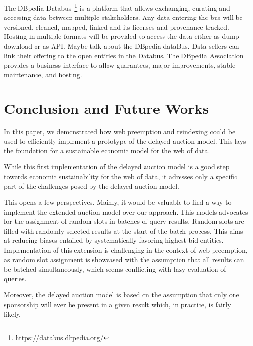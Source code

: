 \documentclass[runningheads]{llncs}
\begin{document}
The DBpedia Databus~\footnote{\url{https://databus.dbpedia.org/}} is a
platform that allows exchanging, curating and accessing data between
multiple stakeholders. Any data entering the bus will be versioned,
cleaned, mapped, linked and its licenses and provenance
tracked. Hosting in multiple formats will be provided to access the
data either as dump download or as API.  Maybe talk about the DBpedia
dataBus.  Data sellers can link their offering to the open entities in
the Databus. The DBpedia Association provides a business interface to
allow guarantees, major improvements, stable maintenance, and hosting.

\section{Conclusion and Future Works}
\label{sec:concl-future-works}

In this paper, we demonstrated how web preemption and reindexing could be
used to efficiently implement a prototype of the delayed auction
model.  This lays the foundation for a sustainable economic model for
the web of data.


While this first implementation of the delayed auction model is a good
step towards economic sustainability for the web of data, it adresses
only a specific part of the challenges posed by the delayed auction
model.

This opens a few perspectives. Mainly, it would be valuable to find a
way to implement the extended auction model over our approach. This
models advocates for the assignment of random slots in batches of
query results. Random slots are filled with randomly selected results
at the start of the batch process. This aims at reducing biases
entailed by systematically favoring highest bid
entities. Implementation of this extension is challenging in the
context of web preemption, as random slot assignment is showcased
with the assumption that all results can be batched simultaneously,
which seems conflicting with lazy evaluation of queries.

Moreover, the delayed auction model is based on the assumption that
only one sponsorship will ever be present in a given result which, in
practice, is fairly likely.



\end{document}
